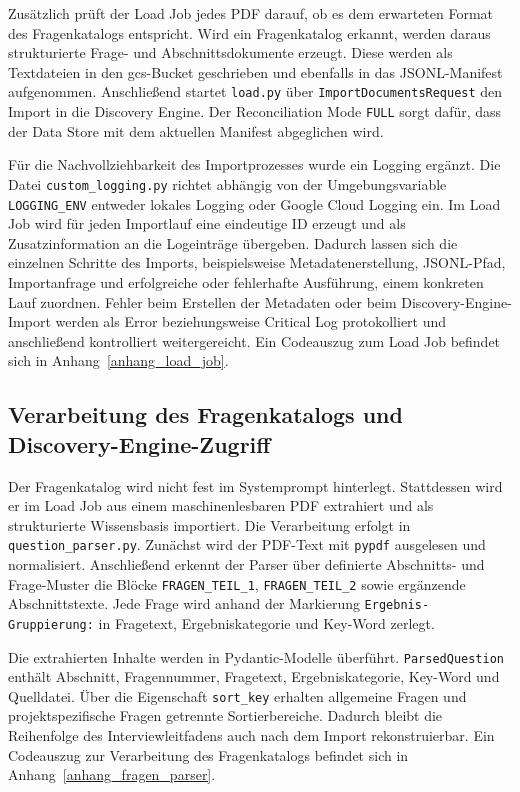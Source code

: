 \documentclass[
  10pt,
  ngerman,
  a4paper,
  toc=graduated,
  numbers=noenddot,
  headings=standardclasses,
  nonumberlist
]{scrartcl}
\newcommand{\code}[1]{\nolinkurl{#1}}
\begin{document}
Zusätzlich prüft der Load Job jedes PDF darauf, ob es dem erwarteten Format des Fragenkatalogs entspricht. Wird ein Fragenkatalog erkannt, werden daraus strukturierte Frage- und Abschnittsdokumente erzeugt. Diese werden als Textdateien in den \gls{gcs}-Bucket geschrieben und ebenfalls in das JSONL-Manifest aufgenommen. Anschließend startet \code{load.py} über \code{ImportDocumentsRequest} den Import in die Discovery Engine. Der Reconciliation Mode \code{FULL} sorgt dafür, dass der Data Store mit dem aktuellen Manifest abgeglichen wird.

Für die Nachvollziehbarkeit des Importprozesses wurde ein Logging ergänzt. Die Datei \code{custom\_logging.py} richtet abhängig von der Umgebungsvariable \code{LOGGING\_ENV} entweder lokales Logging oder Google Cloud Logging ein. Im Load Job wird für jeden Importlauf eine eindeutige ID erzeugt und als Zusatzinformation an die Logeinträge übergeben. Dadurch lassen sich die einzelnen Schritte des Imports, beispielsweise Metadatenerstellung, JSONL-Pfad, Importanfrage und erfolgreiche oder fehlerhafte Ausführung, einem konkreten Lauf zuordnen. Fehler beim Erstellen der Metadaten oder beim Discovery-Engine-Import werden als Error beziehungsweise Critical Log protokolliert und anschließend kontrolliert weitergereicht. Ein Codeauszug zum Load Job befindet sich in Anhang~\ref{anhang_load_job}.
\subsection{Verarbeitung des Fragenkatalogs und Discovery-Engine-Zugriff}
\label{verarbeitung_fragenkatalog_und_discovery_engine}

Der Fragenkatalog wird nicht fest im Systemprompt hinterlegt. Stattdessen wird er im Load Job aus einem maschinenlesbaren PDF extrahiert und als strukturierte Wissensbasis importiert. Die Verarbeitung erfolgt in \code{question\_parser.py}. Zunächst wird der PDF-Text mit \code{pypdf} ausgelesen und normalisiert. Anschließend erkennt der Parser über definierte Abschnitts- und Frage-Muster die Blöcke \code{FRAGEN\_TEIL\_1}, \code{FRAGEN\_TEIL\_2} sowie ergänzende Abschnittstexte. Jede Frage wird anhand der Markierung \code{Ergebnis-Gruppierung:} in Fragetext, Ergebniskategorie und Key-Word zerlegt.

Die extrahierten Inhalte werden in Pydantic-Modelle überführt. \code{ParsedQuestion} enthält Abschnitt, Fragennummer, Fragetext, Ergebniskategorie, Key-Word und Quelldatei. Über die Eigenschaft \code{sort\_key} erhalten allgemeine Fragen und projektspezifische Fragen getrennte Sortierbereiche. Dadurch bleibt die Reihenfolge des Interviewleitfadens auch nach dem Import rekonstruierbar. Ein Codeauszug zur Verarbeitung des Fragenkatalogs befindet sich in Anhang~\ref{anhang_fragen_parser}.
\end{document}
